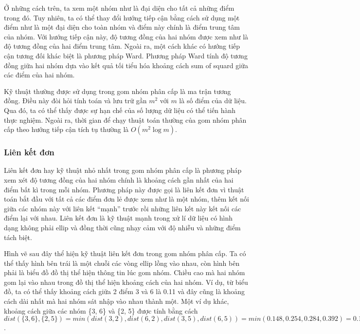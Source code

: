 Ở những cách trên, ta xem một nhóm như là đại diện cho tất cả những điểm trong đó.
Tuy nhiên, ta có thể thay đổi hướng tiếp cận bằng cách sử dụng một điểm như là một đại diện cho toàn nhóm và điểm này chính là điểm trung tâm của nhóm.
Với hướng tiếp cận này, độ tương đồng của hai nhóm được xem như là độ tương đồng của hai điểm trung tâm.
Ngoài ra, một cách khác có hướng tiếp cận tương đối khác biệt là phương pháp Ward.
Phương pháp Ward tính độ tương đồng giữa hai nhóm dựa vào kết quả tối tiểu hóa khoảng cách sum of squard giữa các điểm của hai nhóm.

Kỹ thuật thường được sử dụng trong gom nhóm phân cấp là ma trận tương đồng.
Điều này đòi hỏi tính toán và lưu trữ gần $m^2$ với $m$ là số điểm của dữ liệu.
Qua đó, ta có thể thấy được sự hạn chế của số lượng dữ liệu có thể tiến hành thực nghiệm.
Ngoài ra, thời gian để chạy thuật toán thường của gom nhóm phân cấp theo hướng tiếp cận tích tụ thường là $O(m^2 \log{m}).$

\subsubsection{Liên kết đơn}		
Liên kết đơn hay kỹ thuật nhỏ nhất trong gom nhóm phân cấp là phương pháp xem xét độ tương đồng của hai nhóm chính là khoảng cách gần nhất của hai điểm bất kì trong mỗi nhóm. 
Phương pháp này được gọi là liên kết đơn vì thuật toán bắt đầu với tất cả các điểm đơn lẻ được xem như là một nhóm, thêm kết nối giữa các nhóm này với liên kết ``mạnh'' trước rồi những liên kết này kết nối các điểm lại với nhau.
Liên kết đơn là kỹ thuật mạnh trong xử lí dữ liệu có hình dạng không phải ellip và đồng thời cũng nhạy cảm với độ nhiễu và những điểm tách biệt.

Hình vẽ sau đây thể hiện kỹ thuật liên kết đơn trong gom nhóm phân cấp.
Ta có thể thấy hình bên trái là một chuỗi các vòng ellip lồng vào nhau, còn hình bên phải là biểu đồ đồ thị thể hiện thông tin lúc gom nhóm.
Chiều cao mà hai nhóm gom lại vào nhau trong đồ thị thể hiện khoảng cách của hai nhóm.
Ví dụ, từ biểu đồ, ta có thể thấy khoảng cách giữa 2 điểm 3 và 6 là 0.11 và đây cũng là khoảng cách dài nhất mà hai nhóm sát nhập vào nhau thành một. 
Một ví dụ khác, khoảng cách giữa các nhóm \{3, 6\} và \{2, 5\} được tính  bằng cách $dist(\{3, 6\}, \{2, 5\}) = min(dist(3,2),dist(6, 2), dist(3, 5), dist(6, 5)) = min (0.148, 0.254, 0.284, 0.392) = 0.148$.


